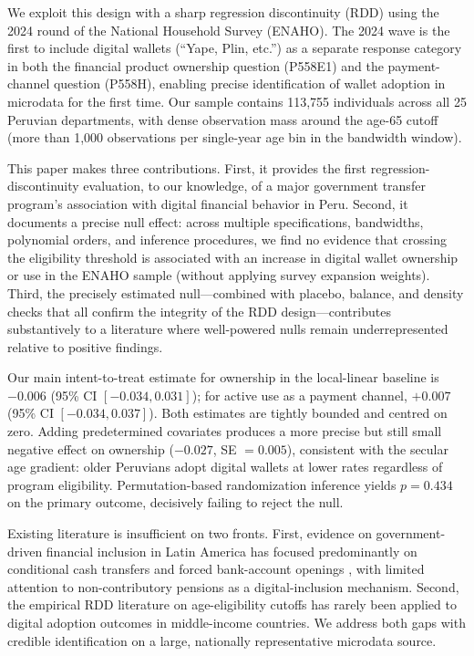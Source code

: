 \documentclass[12pt]{article}
\begin{document}
We exploit this design with a sharp regression discontinuity (RDD) using the 2024 round of the National Household Survey (ENAHO). The 2024 wave is the first to include digital wallets (``Yape, Plin, etc.'') as a separate response category in both the financial product ownership question (P558E1) and the payment-channel question (P558H), enabling precise identification of wallet adoption in microdata for the first time. Our sample contains 113,755 individuals across all 25 Peruvian departments, with dense observation mass around the age-65 cutoff (more than 1,000 observations per single-year age bin in the bandwidth window).

This paper makes three contributions. First, it provides the first regression-discontinuity evaluation, to our knowledge, of a major government transfer program's association with digital financial behavior in Peru. Second, it documents a precise null effect: across multiple specifications, bandwidths, polynomial orders, and inference procedures, we find no evidence that crossing the eligibility threshold is associated with an increase in digital wallet ownership or use in the ENAHO sample (without applying survey expansion weights). Third, the precisely estimated null---combined with placebo, balance, and density checks that all confirm the integrity of the RDD design---contributes substantively to a literature where well-powered nulls remain underrepresented relative to positive findings.

Our main intent-to-treat estimate for ownership in the local-linear baseline is $-0.006$ (95\% CI $[-0.034, 0.031]$); for active use as a payment channel, $+0.007$ (95\% CI $[-0.034, 0.037]$). Both estimates are tightly bounded and centred on zero. Adding predetermined covariates produces a more precise but still small negative effect on ownership ($-0.027$, SE $=0.005$), consistent with the secular age gradient: older Peruvians adopt digital wallets at lower rates regardless of program eligibility. Permutation-based randomization inference yields $p=0.434$ on the primary outcome, decisively failing to reject the null.

Existing literature is insufficient on two fronts. First, evidence on government-driven financial inclusion in Latin America has focused predominantly on conditional cash transfers and forced bank-account openings \citep{bachas2018,muralidharan2016,banerjee2020}, with limited attention to non-contributory pensions as a digital-inclusion mechanism. Second, the empirical RDD literature on age-eligibility cutoffs has rarely been applied to digital adoption outcomes in middle-income countries. We address both gaps with credible identification on a large, nationally representative microdata source.
\end{document}
